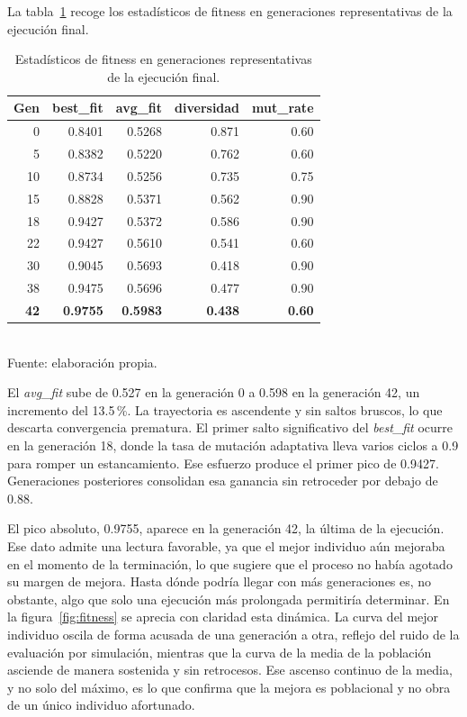 La tabla~\ref{tab:fitness-final} recoge los estadísticos de fitness en generaciones representativas de la ejecución final.

\begin{table}[H]
\centering
\caption{Estadísticos de fitness en generaciones representativas de la ejecución final.}
\label{tab:fitness-final}
\begin{tabular}{rrrrr}
\toprule
\textbf{Gen} & \textbf{best\_fit} & \textbf{avg\_fit} & \textbf{diversidad} & \textbf{mut\_rate} \\
\midrule
0  & 0.8401 & 0.5268 & 0.871 & 0.60 \\
5  & 0.8382 & 0.5220 & 0.762 & 0.60 \\
10 & 0.8734 & 0.5256 & 0.735 & 0.75 \\
15 & 0.8828 & 0.5371 & 0.562 & 0.90 \\
18 & 0.9427 & 0.5372 & 0.586 & 0.90 \\
22 & 0.9427 & 0.5610 & 0.541 & 0.60 \\
30 & 0.9045 & 0.5693 & 0.418 & 0.90 \\
38 & 0.9475 & 0.5696 & 0.477 & 0.90 \\
\textbf{42} & \textbf{0.9755} & \textbf{0.5983} & \textbf{0.438} & \textbf{0.60} \\
\bottomrule
\end{tabular}
\\[2pt]{\footnotesize Fuente: elaboración propia.}
\end{table}

El \emph{avg\_fit} sube de 0.527 en la generación 0 a 0.598 en la generación 42, un incremento del 13.5\,\%. La trayectoria es ascendente y sin saltos bruscos, lo que descarta convergencia prematura. El primer salto significativo del \emph{best\_fit} ocurre en la generación 18, donde la tasa de mutación adaptativa lleva varios ciclos a 0.9 para romper un estancamiento. Ese esfuerzo produce el primer pico de 0.9427. Generaciones posteriores consolidan esa ganancia sin retroceder por debajo de 0.88.

El pico absoluto, 0.9755, aparece en la generación 42, la última de la ejecución. Ese dato admite una lectura favorable, ya que el mejor individuo aún mejoraba en el momento de la terminación, lo que sugiere que el proceso no había agotado su margen de mejora. Hasta dónde podría llegar con más generaciones es, no obstante, algo que solo una ejecución más prolongada permitiría determinar. En la figura~\ref{fig:fitness} se aprecia con claridad esta dinámica. La curva del mejor individuo oscila de forma acusada de una generación a otra, reflejo del ruido de la evaluación por simulación, mientras que la curva de la media de la población asciende de manera sostenida y sin retrocesos. Ese ascenso continuo de la media, y no solo del máximo, es lo que confirma que la mejora es poblacional y no obra de un único individuo afortunado.

